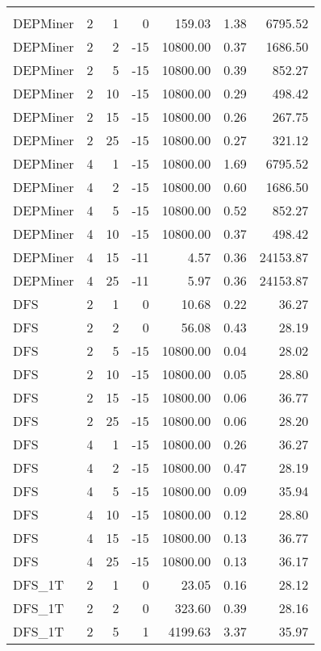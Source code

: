 \begin{center}
\begin{longtable}{lrrrrrr}
\hline\endlastfoot
\\
DEPMiner     & 2 & 1 &   0 & 159.03 & 1.38 & 6795.52 \\ 
  DEPMiner     & 2 & 2 & -15 & 10800.00 & 0.37 & 1686.50 \\ 
  DEPMiner     & 2 & 5 & -15 & 10800.00 & 0.39 & 852.27 \\ 
  DEPMiner     & 2 & 10 & -15 & 10800.00 & 0.29 & 498.42 \\ 
  DEPMiner     & 2 & 15 & -15 & 10800.00 & 0.26 & 267.75 \\ 
  DEPMiner     & 2 & 25 & -15 & 10800.00 & 0.27 & 321.12 \\ 
  DEPMiner     & 4 & 1 & -15 & 10800.00 & 1.69 & 6795.52 \\ 
  DEPMiner     & 4 & 2 & -15 & 10800.00 & 0.60 & 1686.50 \\ 
  DEPMiner     & 4 & 5 & -15 & 10800.00 & 0.52 & 852.27 \\ 
  DEPMiner     & 4 & 10 & -15 & 10800.00 & 0.37 & 498.42 \\ 
  DEPMiner     & 4 & 15 & -11 & 4.57 & 0.36 & 24153.87 \\ 
  DEPMiner     & 4 & 25 & -11 & 5.97 & 0.36 & 24153.87 \\ 
  DFS     & 2 & 1 &   0 & 10.68 & 0.22 & 36.27 \\ 
  DFS     & 2 & 2 &   0 & 56.08 & 0.43 & 28.19 \\ 
  DFS     & 2 & 5 & -15 & 10800.00 & 0.04 & 28.02 \\ 
  DFS     & 2 & 10 & -15 & 10800.00 & 0.05 & 28.80 \\ 
  DFS     & 2 & 15 & -15 & 10800.00 & 0.06 & 36.77 \\ 
  DFS     & 2 & 25 & -15 & 10800.00 & 0.06 & 28.20 \\ 
  DFS     & 4 & 1 & -15 & 10800.00 & 0.26 & 36.27 \\ 
  DFS     & 4 & 2 & -15 & 10800.00 & 0.47 & 28.19 \\ 
  DFS     & 4 & 5 & -15 & 10800.00 & 0.09 & 35.94 \\ 
  DFS     & 4 & 10 & -15 & 10800.00 & 0.12 & 28.80 \\ 
  DFS     & 4 & 15 & -15 & 10800.00 & 0.13 & 36.77 \\ 
  DFS     & 4 & 25 & -15 & 10800.00 & 0.13 & 36.17 \\ 
  DFS\_1T     & 2 & 1 &   0 & 23.05 & 0.16 & 28.12 \\ 
  DFS\_1T     & 2 & 2 &   0 & 323.60 & 0.39 & 28.16 \\ 
  DFS\_1T     & 2 & 5 &   1 & 4199.63 & 3.37 & 35.97 \\ 

\end{longtable}
\end{center}
